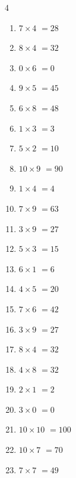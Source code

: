 \begin{multicols}{4}
\begin{enumerate}
  \item $7\times 4$
        $=28$

  \item $8\times 4$
        $=32$

  \item $0\times 6$
        $=0$

  \item $9\times 5$
        $=45$

  \item $6\times 8$
        $=48$

  \item $1\times 3$
        $=3$

  \item $5\times 2$
        $=10$

  \item $10\times 9$
        $=90$

\columnbreak %

  \item $1\times 4$
        $=4$

  \item $7\times 9$
        $=63$

  \item $3\times 9$
        $=27$

  \item $5\times 3$
        $=15$

  \item $6\times 1$
        $=6$

  \item $4\times 5$
        $=20$

  \item $7\times 6$
        $=42$

  \item $3\times 9$
        $=27$

  \item $8\times 4$
        $=32$

  \item $4\times 8$
        $=32$

  \item $2\times 1$
        $=2$

  \item $3\times 0$
        $=0$

  \item $10\times 10$
        $=100$

  \item $10\times 7$
        $=70$

  \item $7\times 7$
        $=49$


\end{enumerate}
\end{multicols}

